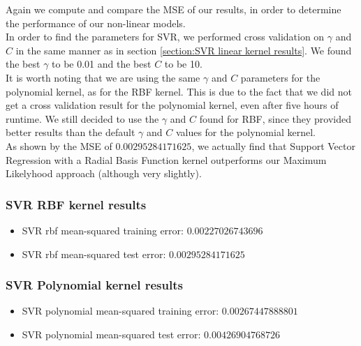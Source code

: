 \documentclass[12pt]{article}
\begin{document}
\noindent Again we compute and compare the MSE of our results, in order to determine the performance of our non-linear models. \\

\noindent In order to find the parameters for SVR, we performed cross validation on $\gamma$ and $C$ in the same manner as in section \ref{section:SVR linear kernel results}.
We found the best $\gamma$ to be 0.01 and the best $C$ to be 10.\\

\noindent It is worth noting that we are using the same $\gamma$ and $C$ parameters for the polynomial kernel, as for the RBF kernel. This is due to the fact that we did not get a cross validation result for the polynomial kernel, even after five hours of runtime.
We still decided to use the $\gamma$ and $C$ found for RBF, since they provided better results than the default $\gamma$ and $C$ values for the polynomial kernel. \\

\noindent As shown by the MSE of $0.00295284171625$, we actually find that Support Vector Regression with a Radial Basis Function kernel outperforms our Maximum Likelyhood approach (although very slightly).

\subsubsection{SVR RBF kernel results}

\begin{itemize}
	\item SVR rbf mean-squared training error: $0.00227026743696$
	\item SVR rbf mean-squared test error: $0.00295284171625$ 
\end{itemize}

\subsubsection{SVR Polynomial kernel results}

\begin{itemize}
	\item SVR polynomial mean-squared training error: $0.00267447888801$
	\item SVR polynomial mean-squared test error: $0.00426904768726$
\end{itemize}
\end{document}
